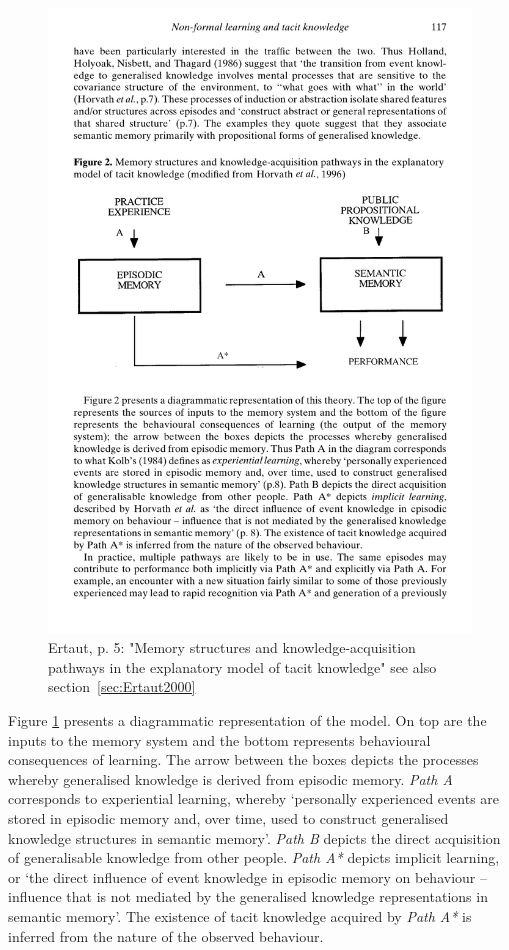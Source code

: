 \documentclass[12pt,a4paper]{article}
\begin{document}
    \begin{figure}[htb]
      \centering
      \includegraphics[width=12cm]{Meeting 4 NON-FORMAL LEARNING - Seite 5.pdf}
      \caption{Ertaut, p. 5: "Memory structures and knowledge-acquisition pathways in the explanatory model of tacit knowledge" see also section~\ref{sec:Ertaut2000}}
      \label{fig:Ertaut tacitknowledgemodel}
    \end{figure}


    Figure \ref{fig:Ertaut tacitknowledgemodel} presents a diagrammatic representation of the model. On top are the inputs to the memory system and the bottom represents behavioural consequences of learning. The arrow between the boxes depicts the processes whereby generalised knowledge is derived from episodic memory.
    \emph{Path A} corresponds to experiential learning, whereby ‘personally experienced events are stored in episodic memory and, over time, used to construct generalised knowledge structures in semantic memory’. \emph{Path B} depicts the direct acquisition of generalisable knowledge from other people. \emph{Path A*} depicts implicit learning, or ‘the direct influence of event knowledge in episodic memory on behaviour – influence that is not mediated by the generalised knowledge representations in semantic memory’. The existence of tacit knowledge acquired by \emph{Path A*} is inferred from the nature of the observed behaviour.
\end{document}
